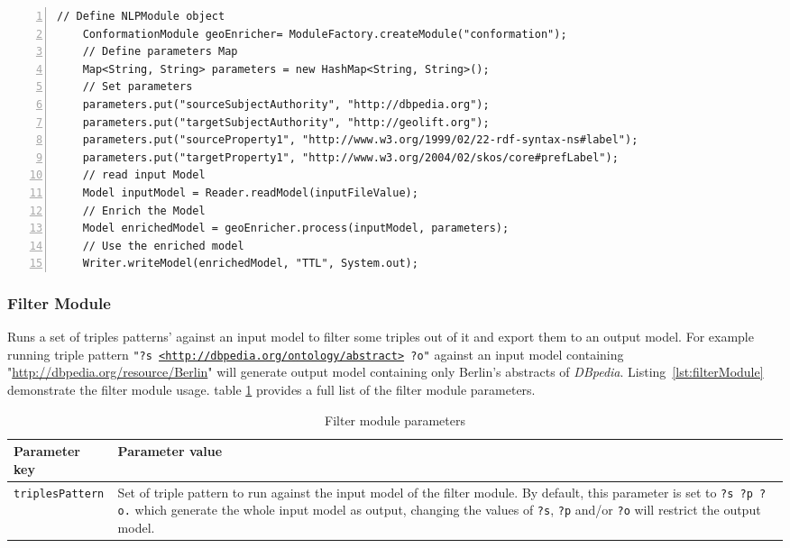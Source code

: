 \documentclass[a4paper,twoside,bibtotoc,abstracton,12pt,BCOR=15mm]{article}
\begin{document}
    \begin{lstlisting}[label=lst:conformModule, float=tp, numbers=left, numberstyle=\tiny, caption = Code fragment to call the \texttt{ConformationModule} class.]
    // Define NLPModule object
    ConformationModule geoEnricher= ModuleFactory.createModule("conformation");
    // Define parameters Map
    Map<String, String> parameters = new HashMap<String, String>();
    // Set parameters
    parameters.put("sourceSubjectAuthority", "http://dbpedia.org");
    parameters.put("targetSubjectAuthority", "http://geolift.org");
    parameters.put("sourceProperty1", "http://www.w3.org/1999/02/22-rdf-syntax-ns#label");
    parameters.put("targetProperty1", "http://www.w3.org/2004/02/skos/core#prefLabel");
    // read input Model
    Model inputModel = Reader.readModel(inputFileValue);
    // Enrich the Model
    Model enrichedModel = geoEnricher.process(inputModel, parameters);
    // Use the enriched model
    Writer.writeModel(enrichedModel, "TTL", System.out);
    \end{lstlisting}

\subsubsection{Filter Module}
    Runs a set of triples patterns' against an input model to filter some triples out of it and export them to an output model. 
    For example running triple pattern \texttt{"?s \url{<http://dbpedia.org/ontology/abstract>} ?o"} against an input model containing "\url{http://dbpedia.org/resource/Berlin}" will generate output model containing only Berlin's abstracts of \emph{DBpedia}.
    Listing~\ref{lst:filterModule} demonstrate the filter module usage.
    table \ref{tbl:filterPram} provides a full list of the filter module parameters.

    \begin{table}
    \caption{Filter module parameters} \label{tbl:filterPram}
    \small
    \begin{tabularx}{\textwidth}{@{}lX@{}}
    \toprule
    \textbf{Parameter key} 	& \textbf{Parameter value} \\
    \toprule
    \texttt{triplesPattern}	& Set of triple pattern to run against the input model of the filter module. By default, this parameter is set to \texttt{?s ?p ?o.} which generate the whole input model as output, changing the values of \texttt{?s}, \texttt{?p} and/or \texttt{?o} will restrict the output model.\\
    \bottomrule
    \end{tabularx}
    \end{table}
    
\end{document}
